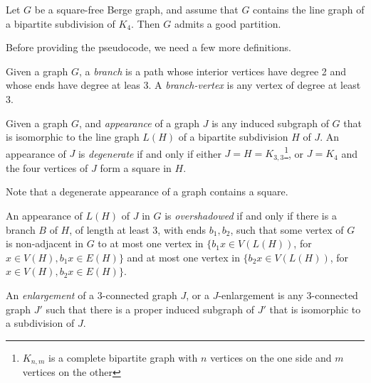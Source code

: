 \begin{theorem}
  Let $G$ be a square-free Berge graph, and assume that $G$ contains the line graph of a bipartite subdivision of $K_4$. Then $G$ admits a good partition.
\end{theorem}

Before providing the pseudocode, we need a few more definitions.

\begin{defnTwo}[branch]
  Given a graph $G$, a \emph{branch} is a path whose interior vertices have degree 2 and whose ends have degree at leas 3. A \emph{branch-vertex} is any vertex of degree at least 3.
\end{defnTwo}

\begin{defnTwo}
  Given a graph $G$, and \emph{appearance} of a graph $J$ is any induced subgraph of $G$ that is isomorphic to the line graph $L(H)$ of a bipartite subdivision $H$ of $J$. An appearance of $J$ is \emph{degenerate} if and only if either $J = H = K_{3, 3}$\footnote{$K_{n, m}$ is a complete bipartite graph with $n$ vertices on the one side and $m$ vertices on the other}, or $J = K_4$ and the four vertices of $J$ form a square in $H$.
\end{defnTwo}

Note that a degenerate appearance of a graph contains a square.

\begin{defnTwo}
  An appearance of $L(H)$ of $J$ in $G$ is \emph{overshadowed} if and only if there is a branch $B$ of $H$, of length at least 3, with ends $b_1, b_2$, such that some vertex of $G$ is non-adjacent in $G$ to at most one vertex in $\{b_1x \in V(L(H))$, for $x \in V(H), b_1x \in E(H)\}$ and at most one vertex in $\{b_2x \in V(L(H))$, for $x \in V(H), b_2x \in E(H)\}$.
\end{defnTwo}

\begin{defnTwo}[$J$-enlargement]
  An \emph{enlargement} of a 3-connected graph $J$, or a $J$-enlargement is any 3-connected graph $J'$ such that there is a proper induced subgraph of $J'$ that is isomorphic to a subdivision of $J$.
\end{defnTwo}

